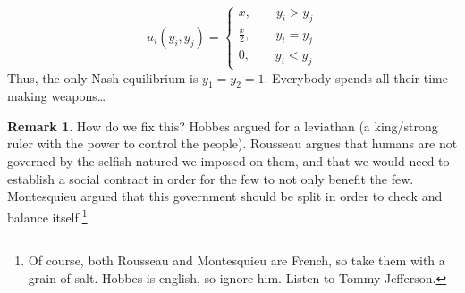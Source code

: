 \documentclass[10pt, oneside]{article}
\theoremstyle{definition}
\newtheorem{rem}{Remark}
\begin{document}
\[u_i(y_i, y_j) = \begin{cases}
    x, \qquad y_i > y_j\\
    \frac{x}{2}, \qquad y_i = y_j\\
    0, \qquad y_i < y_j
\end{cases}\]
Thus, the only Nash equilibrium is $y_1 = y_2 = 1.$ Everybody spends all their time making weapons\dots
\begin{rem}
    How do we fix this? Hobbes argued for a leviathan (a king/strong ruler with the power to control the people). Rousseau argues that humans are not governed by the selfish natured we imposed on them, and that we would need to establish a social contract in order for the few to not only benefit the few. Montesquieu argued that this government should be split in order to check and balance itself.\footnote{Of course, both Rousseau and Montesquieu are French, so take them with a grain of salt. Hobbes is english, so ignore him. Listen to Tommy Jefferson.}
\end{rem}
\end{document}

